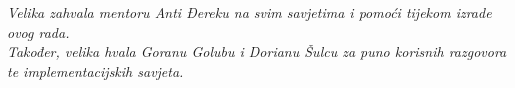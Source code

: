 \vspace*{10cm}
\begin{center}

\textit{Velika zahvala mentoru Anti Đereku na svim savjetima i pomoći tijekom izrade ovog rada.} \\
\textit{Također, velika hvala Goranu Golubu i Dorianu Šulcu za puno korisnih razgovora te implementacijskih savjeta.}

\end{center}
